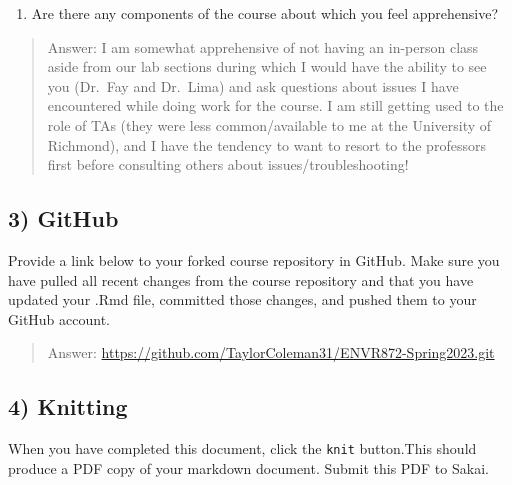 \documentclass[
]{article}
\providecommand{\tightlist}{%
  \setlength{\itemsep}{0pt}\setlength{\parskip}{0pt}}
\begin{document}
\begin{enumerate}
\def\labelenumi{\arabic{enumi}.}
\setcounter{enumi}{2}
\tightlist
\item
  Are there any components of the course about which you feel
  apprehensive?
\end{enumerate}

\begin{quote}
Answer: I am somewhat apprehensive of not having an in-person class
aside from our lab sections during which I would have the ability to see
you (Dr.~Fay and Dr.~Lima) and ask questions about issues I have
encountered while doing work for the course. I am still getting used to
the role of TAs (they were less common/available to me at the University
of Richmond), and I have the tendency to want to resort to the
professors first before consulting others about issues/troubleshooting!
\end{quote}

\hypertarget{github}{%
\subsection{3) GitHub}\label{github}}

Provide a link below to your forked course repository in GitHub. Make
sure you have pulled all recent changes from the course repository and
that you have updated your .Rmd file, committed those changes, and
pushed them to your GitHub account.

\begin{quote}
Answer: \url{https://github.com/TaylorColeman31/ENVR872-Spring2023.git}
\end{quote}

\hypertarget{knitting}{%
\subsection{4) Knitting}\label{knitting}}

When you have completed this document, click the \texttt{knit}
button.This should produce a PDF copy of your markdown document. Submit
this PDF to Sakai.
\end{document}
